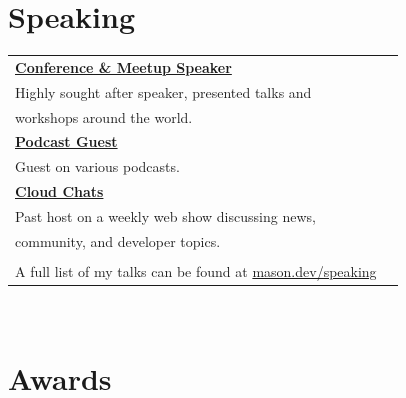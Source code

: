 \documentclass[10pt]{article} %
\newcommand\tab[1][1cm]{\hspace*{#1}}
\begin{document}
\begin{minipage}[t]{0.44\textwidth} %
\vspace{0pt} %


\section{Speaking} 

\begin{tabular}{ll}

\textbf{\href{https://mason.dev/speaking}{Conference \& Meetup Speaker}} \\
\tab Highly sought after speaker, presented talks and   \\ 
\tab workshops around the world. \\

\textbf{\href{https://mason.dev/speaking/category/podcast/}{Podcast Guest}} \\
\tab Guest on various podcasts. \\

\textbf{\href{https://www.digitalocean.com/community/pages/cloud-chats}{Cloud Chats}} \\
\tab Past host on a weekly web show discussing news, \\
\tab community, and developer topics.\\
\\

A full list of my talks can be found at \href{https://mason.dev/speaking}{mason.dev/speaking}\\

\end{tabular}\\


\section{Awards} 

\begin{tabular}{rl}


\end{tabular}
\end{minipage}
\end{document}
